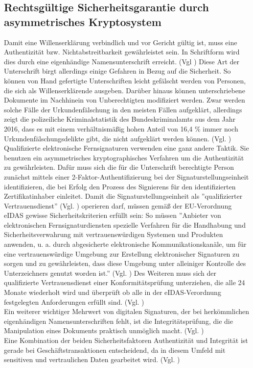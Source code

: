 \documentclass[deutsch]{lib/llncs/llncs}
\begin{document}
\subsection{Rechtsgültige Sicherheitsgarantie durch asymmetrisches Kryptosystem}
Damit eine Willenserklärung verbindlich und vor Gericht gültig ist, muss eine Authentizität bzw. Nichtabstreitbarkeit gewährleistet sein. In Schriftform wird dies durch eine eigenhändige Namensunterschrift erreicht. (Vgl \cite[S. 5-6]{Zitat07}) Diese Art der Unterschrift birgt allerdings einige Gefahren in Bezug auf die Sicherheit. So können von Hand gefertigte Unterschriften leicht gefälscht werden von Personen, die sich als Willenserklärende ausgeben. Darüber hinaus können unterschriebene Dokumente im Nachhinein von Unberechtigten modifiziert werden. Zwar werden solche Fälle der Urkundenfälschung in den meisten Fällen aufgeklärt, allerdings zeigt die polizeiliche Kriminalstatistik des Bundeskriminalamts aus dem Jahr 2016, dass es mit einem verhältnismäßig hohen Anteil von 16,4 \% immer noch Urkundenfälschungsdelikte gibt, die nicht aufgeklärt werden können. (Vgl. \cite[S. 34]{Zitat10})\\
Qualifizierte elektronische Fernsignaturen verwenden eine ganz andere Taktik. Sie benutzen ein asymmetrisches kryptographisches Verfahren um die Authentizität zu gewährleisten. Dafür muss sich die für die Unterschrift berechtigte Person zunächst mittels einer 2-Faktor-Authentifizierung bei der Signaturstellungseinheit identifizieren, die bei Erfolg den Prozess des Signierens für den identifizierten Zertifikatinhaber einleitet. Damit die Signaturstellungseinheit als ''qualifizierter Vertrauensdienst'' (Vgl. \cite[S. 30]{Zitat08}) operieren darf, müssen gemäß der EU-Verordnung eIDAS gewisse Sicherheitskriterien erfüllt sein: So müssen ''Anbieter von elektronischen Fernsignaturdiensten spezielle Verfahren für die Handhabung und Sicherheitsverwahrung mit vertrauenswürdigen Systemen und Produkten anwenden, u. a. durch abgesicherte elektronische Kommunikationskanäle, um für eine vertrauenswürdige Umgebung zur Erstellung elektronischer Signaturen zu sorgen und zu gewährleisten, dass diese Umgebung unter alleiniger Kontrolle des Unterzeichners genutzt worden ist.'' (Vgl. \cite[S. 233]{Zitat09}) Des Weiteren muss sich der qualifizierte Vertrauensdienst einer Konformitätsprüfung unterziehen, die alle 24 Monate wiederholt wird und überprüft ob alle in der eIDAS-Verordnung festgelegten Anforderungen erfüllt sind. (Vgl. \cite[S. 30]{Zitat08}) \\
Ein weiterer wichtiger Mehrwert von digitalen Signaturen, der bei herkömmlichen eigenhändigen Namensunterschriften fehlt, ist die Integritätsprüfung, die die Manipulation eines Dokuments praktisch unmöglich macht. (Vgl. \cite[S. 7]{Zitat05}) \\
Eine Kombination der beiden Sicherheitsfaktoren Authentizität und Integrität ist gerade bei Geschäftstransaktionen entscheidend, da in diesem Umfeld mit sensitiven und vertraulichen Daten gearbeitet wird. (Vgl. \cite[S. 7]{Zitat05})
\end{document}
